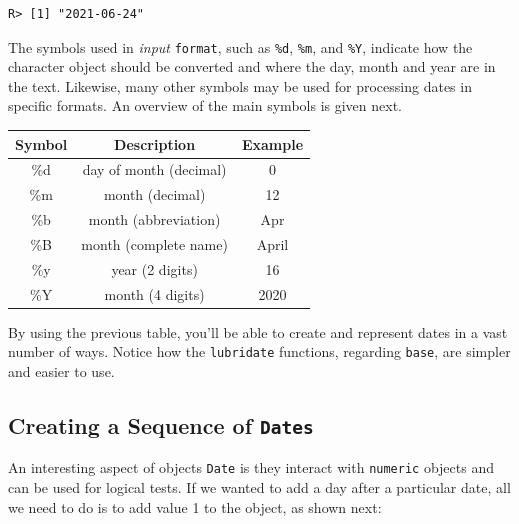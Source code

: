 \documentclass[
  12pt,
]{book}
\newenvironment{Shaded}{\begin{snugshade}}{\end{snugshade}}
\newcommand{\CommentTok}[1]{\textcolor[rgb]{0.37,0.37,0.37}{\textit{#1}}}
\newcommand{\DataTypeTok}[1]{\textcolor[rgb]{0.27,0.27,0.27}{#1}}
\newcommand{\KeywordTok}[1]{\textcolor[rgb]{0.27,0.27,0.27}{\textbf{#1}}}
\newcommand{\NormalTok}[1]{#1}
\newcommand{\StringTok}[1]{\textcolor[rgb]{0.5,0.5,0.5}{#1}}
\begin{document}
\begin{Shaded}
\end{Shaded}

\begin{verbatim}
R> [1] "2021-06-24"
\end{verbatim}

The symbols used in \emph{input} \texttt{format}, such as \texttt{\%d}, \texttt{\%m}, and \texttt{\%Y}, indicate how the character object should be converted and where the day, month and year are in the text. Likewise, many other symbols may be used for processing dates in specific formats. An overview of the main symbols is given next.

\begin{longtable}[]{@{}ccc@{}}
\toprule
Symbol & Description & Example\tabularnewline
\midrule
\endhead
\%d & day of month (decimal) & 0\tabularnewline
\%m & month (decimal) & 12\tabularnewline
\%b & month (abbreviation) & Apr\tabularnewline
\%B & month (complete name) & April\tabularnewline
\%y & year (2 digits) & 16\tabularnewline
\%Y & month (4 digits) & 2020\tabularnewline
\bottomrule
\end{longtable}

By using the previous table, you'll be able to create and represent dates in a vast number of ways. Notice how the \texttt{lubridate} functions, regarding \texttt{base}, are simpler and easier to use.

\hypertarget{creating-a-sequence-of-dates}{%
\subsection{\texorpdfstring{Creating a Sequence of \texttt{Dates}}{Creating a Sequence of Dates}}\label{creating-a-sequence-of-dates}}

An interesting aspect of objects \texttt{Date} is they interact with \texttt{numeric} objects and can be used for logical tests. If we wanted to add a day after a particular date, all we need to do is to add value 1 to the object, as shown next:
\end{document}
